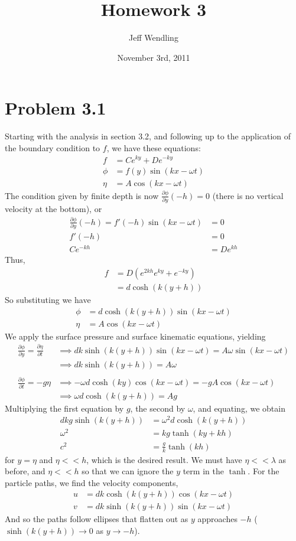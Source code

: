\documentclass[12pt]{article}
\title{Homework 3}
\author{Jeff Wendling}
\date{November 3rd, 2011}
\newcommand{\eq}[1]{\begin{align*}#1\end{align*}}
\newcommand{\p}[2]{\frac{\partial#1}{\partial#2}}
\begin{document}
\maketitle
\section*{Problem 3.1} Starting with the analysis in section 3.2, and following up to the application of the boundary condition to $f$, we have these equations:
\eq{
	f &= Ce^{ky} + De^{-ky}\\
	\phi &= f(y)\sin(kx - \omega t)\\
	\eta &= A\cos(kx - \omega t)
}
The condition given by finite depth is now $\p{\phi}{y}(-h) = 0$ (there is no vertical velocity at the bottom), or
\eq{
	\p{\phi}{y}(-h) = f'(-h)\sin(kx - \omega t) &= 0\\
	f'(-h) &= 0\\
	Ce^{-kh} &= De^{kh}
}
Thus,
\eq{
	f &= D(e^{2kh}e^{ky} + e^{-ky})\\
	&= d\cosh(k(y + h))
}
So substituting we have
\eq{
	\phi &= d\cosh(k(y + h))\sin(kx - \omega t)\\
	\eta &= A\cos(kx - \omega t)
}
We apply the surface pressure and surface kinematic equations, yielding
\eq{
	\p{\phi}{y} = \p{\eta}{t} &\implies dk\sinh(k(y + h))\sin(kx - \omega t) = A\omega\sin(kx - \omega t)\\
	&\implies dk\sinh(k(y + h)) = A\omega\\
	\\
	\p{\phi}{t} = -g\eta &\implies -\omega d\cosh(ky)\cos(kx - \omega t) = -gA\cos(kx - \omega t)\\
	&\implies \omega d\cosh(k(y + h)) = Ag
}
Multiplying the first equation by $g$, the second by $\omega$, and equating, we obtain
\eq{
	dkg\sinh(k(y + h)) &= \omega^2 d \cosh(k(y + h))\\
	\omega^2 &= kg\tanh(ky + kh)\\
	c^2 &= \frac{g}{k}\tanh(kh)
}
for $y = \eta$ and $\eta << h$, which is the desired result. We must have $\eta << \lambda$ as before, and $\eta << h$ so that we can ignore the $y$ term in the $\tanh$.
For the particle paths, we find the velocity components,
\eq{
	u &= dk\cosh(k(y + h))\cos(kx - \omega t)\\
	v &= dk\sinh(k(y + h))\sin(kx - \omega t)
}
And so the paths follow ellipses that flatten out as $y$ approaches $-h$ ($\sinh(k(y + h)) \rightarrow 0$ as $y \rightarrow -h$).
\end{document}
